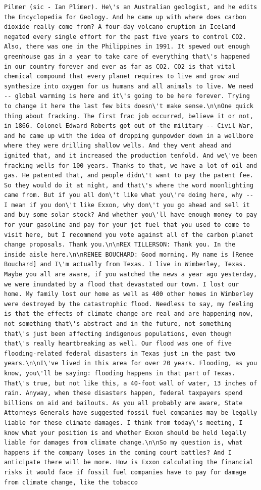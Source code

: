 \documentclass[
  letterpaper,
  DIV=11,
  numbers=noendperiod]{scrreprt}
\begin{document}
\begin{verbatim}
Pilmer (sic - Ian Plimer). He\'s an Australian geologist, and he edits the Encyclopedia for Geology. And he came up with where does carbon dioxide really come from? A four-day volcano eruption in Iceland negated every single effort for the past five years to control CO2. Also, there was one in the Philippines in 1991. It spewed out enough greenhouse gas in a year to take care of everything that\'s happened in our country forever and ever as far as CO2. CO2 is that vital chemical compound that every planet requires to live and grow and synthesize into oxygen for us humans and all animals to live. We need -- global warming is here and it\'s going to be here forever. Trying to change it here the last few bits doesn\'t make sense.\n\nOne quick thing about fracking. The first frac job occurred, believe it or not, in 1866. Colonel Edward Roberts got out of the military -- Civil War, and he came up with the idea of dropping gunpowder down in a wellbore where they were drilling shallow wells. And they went ahead and ignited that, and it increased the production tenfold. And we\'ve been fracking wells for 100 years. Thanks to that, we have a lot of oil and gas. He patented that, and people didn\'t want to pay the patent fee. So they would do it at night, and that\'s where the word moonlighting came from. But if you all don\'t like what you\'re doing here, why -- I mean if you don\'t like Exxon, why don\'t you go ahead and sell it and buy some solar stock? And whether you\'ll have enough money to pay for your gasoline and pay for your jet fuel that you used to come to visit here, but I recommend you vote against all of the carbon planet change proposals. Thank you.\n\nREX TILLERSON: Thank you. In the inside aisle here.\n\nRENEE BOUCHARD: Good morning. My name is [Renee Bouchard] and I\'m actually from Texas. I live in Wimberley, Texas. Maybe you all are aware, if you watched the news a year ago yesterday, we were inundated by a flood that devastated our town. I lost our home. My family lost our home as well as 400 other homes in Wimberley were destroyed by the catastrophic flood. Needless to say, my feeling is that the effects of climate change are real and are happening now, not something that\'s abstract and in the future, not something that\'s just been affecting indigenous populations, even though that\'s really heartbreaking as well. Our flood was one of five flooding-related federal disasters in Texas just in the past two years.\n\nI\'ve lived in this area for over 20 years. Flooding, as you know, you\'ll be saying: flooding happens in that part of Texas. That\'s true, but not like this, a 40-foot wall of water, 13 inches of rain. Anyway, when these disasters happen, federal taxpayers spend billions on aid and bailouts. As you all probably are aware, State Attorneys Generals have suggested fossil fuel companies may be legally liable for these climate damages. I think from today\'s meeting, I know what your position is and whether Exxon should be held legally liable for damages from climate change.\n\nSo my question is, what happens if the company loses in the coming court battles? And I anticipate there will be more. How is Exxon calculating the financial risks it would face if fossil fuel companies have to pay for damage from climate change, like the tobacco 
\end{verbatim}
\end{document}
